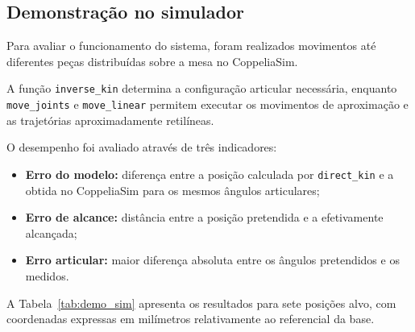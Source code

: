 
\subsection{Demonstração no simulador}
\label{sec:demo_sim}

Para avaliar o funcionamento do sistema, foram realizados movimentos até diferentes peças distribuídas sobre a mesa no CoppeliaSim.

A função \texttt{inverse\_kin} determina a configuração articular necessária, enquanto \texttt{move\_joints} e \texttt{move\_linear} permitem executar os movimentos de aproximação e as trajetórias aproximadamente retilíneas.

O desempenho foi avaliado através de três indicadores:
\begin{itemize}
    \item \textbf{Erro do modelo:} diferença entre a posição calculada por \texttt{direct\_kin} e a obtida no CoppeliaSim para os mesmos ângulos articulares;
    \item \textbf{Erro de alcance:} distância entre a posição pretendida e a efetivamente alcançada;
    \item \textbf{Erro articular:} maior diferença absoluta entre os ângulos pretendidos e os medidos.
\end{itemize}

A Tabela~\ref{tab:demo_sim} apresenta os resultados para sete posições alvo, com coordenadas expressas em milímetros relativamente ao referencial da base.

\begin{table}[H]
    \centering
    \caption{Resultados do movimento até diferentes posições alvo no simulador.}
    \label{tab:demo_sim}
\end{table}

